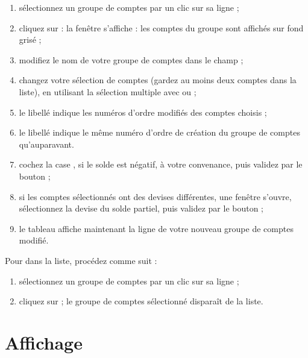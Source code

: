 \begin{enumerate}
	\item sélectionnez un groupe de comptes par un clic sur sa ligne ;
	\item cliquez sur  : la fenêtre  s'affiche : les comptes du groupe sont affichés sur fond grisé ;
	\item modifiez le nom de votre groupe de comptes dans le champ  ;
	\item changez votre sélection de comptes (gardez au moins deux comptes dans la liste), en utilisant la sélection multiple avec  ou  ; 
 	\item le libellé  indique les numéros d'ordre modifiés des comptes choisis ;
	\item le libellé  indique le même numéro d'ordre de création du groupe de comptes qu'auparavant.

	\item cochez la case  , si le solde est négatif, à votre convenance, puis validez par le bouton  ;
	\item si les comptes sélectionnés ont des devises différentes, une fenêtre s'ouvre, sélectionnez la devise du solde partiel, puis validez par le bouton  ;
	\item le tableau  affiche maintenant la ligne de votre nouveau groupe de comptes modifié. 
\end{enumerate}


Pour  dans la liste, procédez comme suit :

\begin{enumerate}
	\item sélectionnez un groupe de comptes par un clic sur sa ligne ;
	\item cliquez sur  ; le groupe de comptes sélectionné disparaît de la liste.
\end{enumerate}

\newpage


\section{Affichage\label{setup-display}}


